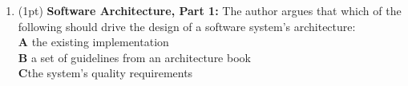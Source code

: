 \documentclass{report}
\newif\ifkey
\newcommand{\correct}[1]{\ifkey\color{red}\textbf{#1}\color{black}\else\textbf{#1}\fi\xspace}
\newcommand*{\pts}[1]{\addtocounter{points}{#1}(#1pt)}
\begin{document}
\begin{spacing}{1.4}
\begin{enumerate}[leftmargin=*]

\item \pts{1}
  \textbf{Software Architecture, Part 1:}
  The author argues that which of the following should drive the design of a software system’s architecture:
  \\ \textbf{A}\hspace{0.2in} the existing implementation
  \\ \textbf{B}\hspace{0.2in} a set of guidelines from an architecture book
  \\ \correct{C}\hspace{0.2in}the system’s quality requirements


 


\end{enumerate}
\end{spacing}
\end{document}
